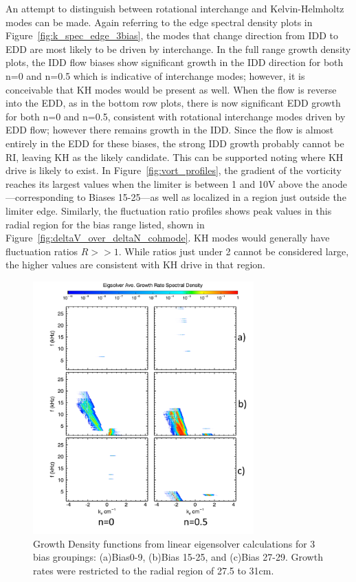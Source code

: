 \documentclass[aip,pop,amsmath,amssymb,reprint,superscriptaddress]{revtex4-1} %
\begin{document}
An attempt to distinguish between rotational interchange and Kelvin-Helmholtz modes can be made. Again referring to the edge spectral density plots in Figure~\ref{fig:k_spec_edge_3bias}, the modes that change direction from IDD to EDD are most likely to be driven by interchange. In the full range growth density plots, the IDD flow biases show significant growth in the IDD direction for both n=0 and n=0.5 which is indicative of interchange modes; however, it is conceivable that KH modes would be present as well. When the flow is reverse into the EDD, as in the bottom row plots, there is now significant EDD growth for both n=0 and n=0.5, consistent with rotational interchange modes driven by EDD flow; however there remains growth in the IDD. Since the flow is almost entirely in the EDD for these biases, the strong IDD growth probably cannot be RI, leaving KH as the likely candidate. This can be supported noting where KH drive is likely to exist. In Figure~\ref{fig:vort_profiles}, the gradient of the vorticity reaches its largest values when the limiter is between 1 and 10V above the anode---corresponding to Biases 15-25---as well as localized in a region just outside the limiter edge. Similarly, the fluctuation ratio profiles shows peak values in this radial region for the bias range listed, shown in Figure~\ref{fig:deltaV_over_deltaN_cohmode}. KH modes would generally have fluctuation ratios $R >> 1$. While ratios just under 2 cannot be considered large, the higher values are consistent with KH drive in that region.

\begin{figure}[!htbp]
\centerline{
\includegraphics[width=8.5cm]{growth_density_27p5to31_lab}}%
\caption{\label{fig:growth_density_27p5to31} Growth Density functions from linear eigensolver calculations for 3 bias groupings: (a)Bias0-9, (b)Bias 15-25, and (c)Bias 27-29. Growth rates were restricted to the radial region of 27.5 to 31cm.}
\end{figure}
\end{document}
